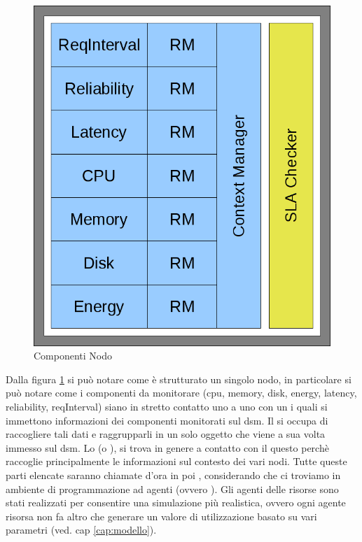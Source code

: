 \begin{figure}[H]
\begin{center}
\includegraphics[scale=0.5]{etc/nodo.png}
\caption{Componenti Nodo}
\label{componentinodo}
\end{center}
\end{figure}
Dalla figura \ref{componentinodo} si può notare come è strutturato un singolo nodo, in particolare si può notare come i componenti da monitorare (cpu, memory, disk, energy, latency, reliability, reqInterval) siano in stretto contatto uno a uno con un  i quali si immettono informazioni dei componenti monitorati sul dsm. Il  si occupa di raccogliere tali dati e raggrupparli in un solo oggetto che viene a sua volta immesso sul dsm. Lo  (o ), si trova in genere a contatto con il  questo perchè raccoglie principalmente le informazioni sul contesto dei vari nodi. Tutte queste parti elencate saranno chiamate d'ora in poi , considerando che ci troviamo in ambiente di programmazione ad agenti (ovvero ). Gli agenti delle risorse sono stati realizzati per consentire una simulazione più realistica, ovvero ogni agente risorsa non fa altro che generare un valore di utilizzazione basato su vari parametri (ved. cap \ref{cap:modello}).
